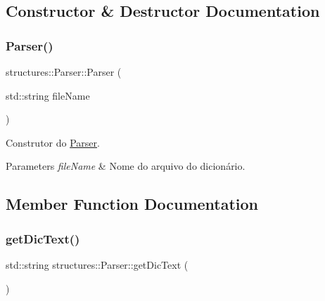 \subsection{Constructor \& Destructor Documentation}
\mbox{\label{classstructures_1_1Parser_a62344223eabcf9cd5e2cf6f6b5ea2139}} 
\subsubsection{\texorpdfstring{Parser()}{Parser()}}
{\footnotesize\ttfamily structures\+::\+Parser\+::\+Parser (\begin{DoxyParamCaption}\item[{std\+::string}]{file\+Name }\end{DoxyParamCaption})\hspace{0.3cm}{\ttfamily [inline]}}



Construtor do \hyperlink{classstructures_1_1Parser}{Parser}. 


\begin{DoxyParams}{Parameters}
{\em file\+Name} & Nome do arquivo do dicionário. \\
\hline
\end{DoxyParams}


\subsection{Member Function Documentation}
\mbox{\label{classstructures_1_1Parser_a0c3fe341a7d74b1db953cc19eeba7062}} 
\subsubsection{\texorpdfstring{get\+Dic\+Text()}{getDicText()}}
{\footnotesize\ttfamily std\+::string structures\+::\+Parser\+::get\+Dic\+Text (\begin{DoxyParamCaption}{ }\end{DoxyParamCaption})\hspace{0.3cm}{\ttfamily [inline]}}



